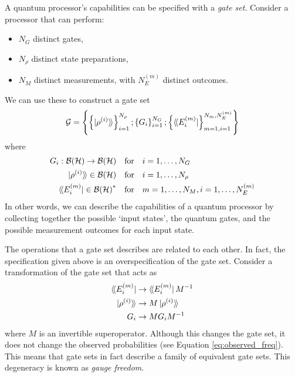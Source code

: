 A quantum processor's capabilities can be specified with a \textit{gate set}. Consider a processor
that can perform:
\begin{itemize}
    \item $N_G$ distinct gates,
    \item $N_{\rho}$ distinct state preparations,
    \item $N_M$ distinct measurements, with $N_E^{(m)}$ distinct outcomes.
\end{itemize}
We can use these to construct a gate set
\begin{equation}
    \mathcal{G} = 
    \left\{
        \left\{
            \ket{\rho^{(i)}}\!\rangle
        \right\}^{N_{\rho}}_{i=1} ;
        \left\{
            G_i
        \right\}^{N_G}_{i=1} ;
        \left\{
            \langle\!\bra{E_i^{(m)}}
        \right\}^{N_m, N_E^{(m)}}_{m=1, i=1}
    \right\}
\end{equation}
where
\begin{equation}
    \begin{aligned}
        G_i : \mathcal{B(H)} \to \mathcal{B(H)}  \quad &\text{for} \quad i = 1, \dots, N_G \\
        \ket{\rho^{(i)}}\!\rangle \in \mathcal{B(H)} \quad &\text{for} \quad i = 1, \dots, N_{\rho} \\
        \langle\!\bra{E_i^{(m)}} \in \mathcal{B(H)}^*  \quad &\text{for} \quad m = 1, \dots, N_M, i = 1, \dots, N_E^{(m)} \\
    \end{aligned}
\end{equation}
In other words, we can describe the capabilities of a quantum processor by collecting together the
possible `input states', the quantum gates, and the possible measurement outcomes for each input
state.

The operations that a gate set describes are related to each other. In fact, the specification given
above is an overspecification of the gate set. Consider a transformation of the gate set that acts
as
\begin{equation}
    \begin{aligned}
        \langle\!\bra{E_i^{(m)}}  &\to \langle\!\bra{E_i^{(m)}} M^{-1} \\
        \ket{\rho^{(i)}}\!\rangle &\to M \ket{\rho^{(i)}}\!\rangle \\
        G_i                   &\to M G_i M^{-1}
    \end{aligned}
\end{equation}
where $M$ is an invertible superoperator. Although this changes the gate set, it does not change the
observed probabilities (see Equation \ref{eq:observed_freq}). This means that gate sets in fact
describe a family of equivalent gate sets. This degeneracy is known as \textit{gauge freedom}.

